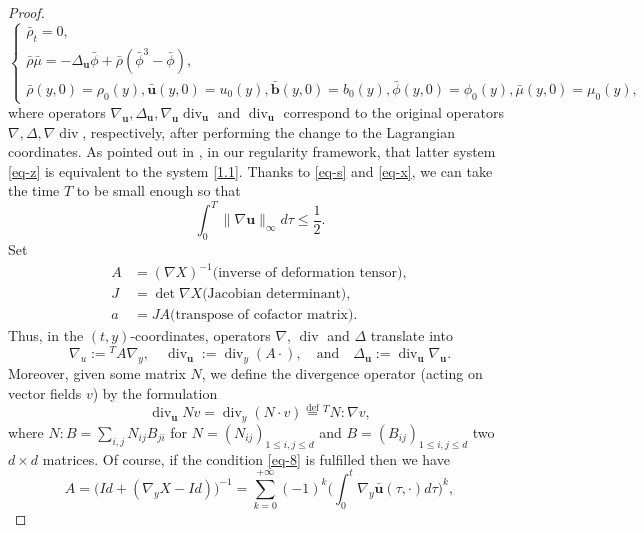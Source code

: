 \documentclass[11pt]{article}
\numberwithin{equation}{section}
\begin{document}
\begin{proof}
\begin{equation}
\begin{cases}
\bar{\rho}_t = 0 , \\
\bar{\rho} \bar{\mu} = -\Delta_\mathbf{u}\bar{\phi}+\bar{\rho}(\bar{\phi}^3-\bar{\phi}),\\
\bar{\rho}(y, 0) = \rho_0(y), \bar{\mathbf{u}}(y, 0) = u_0(y),  \bar{\mathbf{b}}(y, 0) = b_0(y), \bar{\phi}(y, 0) = \phi_0(y) ,
\bar{\mu}(y, 0) = \mu_0(y),&
\end{cases}
\end{equation}
where operators \(\nabla_\mathbf{u}, \Delta_\mathbf{u}, \nabla_\mathbf{u} \operatorname{div}_\mathbf{u}\) and \(\operatorname{div}_\mathbf{u}\) correspond to the original operators \(\nabla, \Delta, \nabla \operatorname{div}\), respectively, after performing the change to the Lagrangian coordinates.
As pointed out in \cite{RB1, B2, PZZ}, in our regularity framework, that latter system \eqref{eq-z} is equivalent to the system \eqref{1.1}. Thanks to \eqref{eq-s} and \eqref{eq-x}, we can take the time $T$ to be small enough so that
\begin{equation}
\int_0^T \|\nabla \mathbf{u}\|_\infty d\tau \leq \frac{1}{2}.\label{eq-8}
\end{equation}
Set
\begin{align*}
A &= (\nabla X)^{-1} \text{(inverse of deformation tensor)}, \\
J &= \det \nabla X \text{(Jacobian determinant)}, \\
a &= JA \text{(transpose of cofactor matrix)}.
\end{align*}
Thus, in the \((t, y)\)-coordinates, operators \(\nabla\), \(\operatorname{div}\) and \(\Delta\) translate into
\begin{equation}
\nabla_u := {}^T\!A \nabla_y, \quad \operatorname{div}_\mathbf{u} := \operatorname{div}_y(A \cdot), \quad \text{and} \quad \Delta_\mathbf{u} := \operatorname{div}_\mathbf{u}\nabla_\mathbf{u}. \label{eq-6}
\end{equation}
Moreover, given some matrix \( N \), we define the divergence operator (acting on vector fields \( v \)) by the formulation
\begin{equation}
\operatorname{div}_\mathbf{u} N v = \operatorname{div}_y(N \cdot v) \stackrel{\text{def}}{=} {}^T\!N : \nabla v,
\end{equation}
where \( N : B = \sum_{i,j} N_{ij} B_{ji} \) for \( N = (N_{ij})_{1 \leq i,j \leq d} \) and \( B = (B_{ij})_{1 \leq i,j \leq d} \) two \( d \times d \) matrices.
Of course, if the condition \eqref{eq-8} is fulfilled then we have
\begin{equation}
A = \Big( Id + (\nabla_y X - Id) \Big)^{-1} = \sum_{k=0}^{+\infty} (-1)^k \big( \int_0^t \nabla_y \bar{\mathbf{u}}(\tau, \cdot) d\tau \big)^k,\label{eq-9}

\end{equation}
\end{proof}
\end{document}
